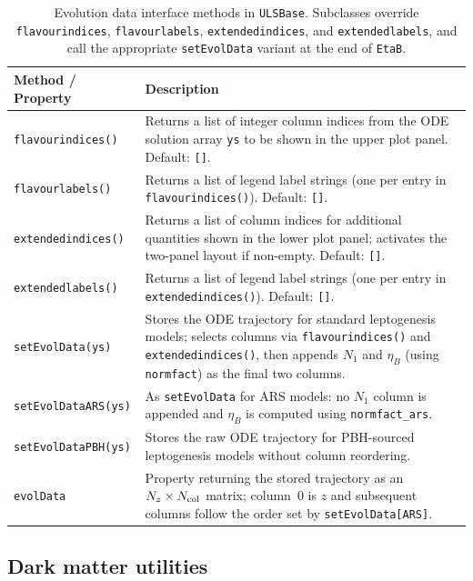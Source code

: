 \documentclass[12pt, a4paper]{article}
\begin{document}
\begin{table}[H]
\centering\small
\renewcommand{\arraystretch}{1.25}
\begin{tabular}{p{4.6cm} p{9.4cm}}
\hline
\textbf{Method / Property} & \textbf{Description} \\
\hline
\texttt{flavourindices()} & Returns a list of integer column indices from the ODE solution
  array \texttt{ys} to be shown in the upper plot panel. Default: \texttt{[]}. \\
\texttt{flavourlabels()} & Returns a list of legend label strings (one per entry in
  \texttt{flavourindices()}). Default: \texttt{[]}. \\
\texttt{extendedindices()} & Returns a list of column indices for additional quantities shown
  in the lower plot panel; activates the two-panel layout if non-empty. Default: \texttt{[]}. \\
\texttt{extendedlabels()} & Returns a list of legend label strings (one per entry in
  \texttt{extendedindices()}). Default: \texttt{[]}. \\
\texttt{setEvolData(ys)} & Stores the ODE trajectory for standard leptogenesis models;
  selects columns via \texttt{flavourindices()} and \texttt{extendedindices()}, then appends
  $N_1$ and $\eta_B$ (using \texttt{normfact}) as the final two columns. \\
\texttt{setEvolDataARS(ys)} & As \texttt{setEvolData} for ARS models: no $N_1$ column is
  appended and $\eta_B$ is computed using \texttt{normfact\_ars}. \\
\texttt{setEvolDataPBH(ys)} & Stores the raw ODE trajectory for PBH-sourced leptogenesis
  models without column reordering. \\
\texttt{evolData} & Property returning the stored trajectory as an $N_z\times N_{\rm col}$
  matrix; column~0 is $z$ and subsequent columns follow the order set by
  \texttt{setEvolData[ARS]}. \\
\hline
\end{tabular}
\caption{Evolution data interface methods in \texttt{ULSBase}. Subclasses override
\texttt{flavourindices}, \texttt{flavourlabels}, \texttt{extendedindices}, and
\texttt{extendedlabels}, and call the appropriate \texttt{setEvolData} variant at the end of
\texttt{EtaB}.}
\label{tab:ulsbase_evol}
\end{table}

\subsection*{Dark matter utilities}
\end{document}

